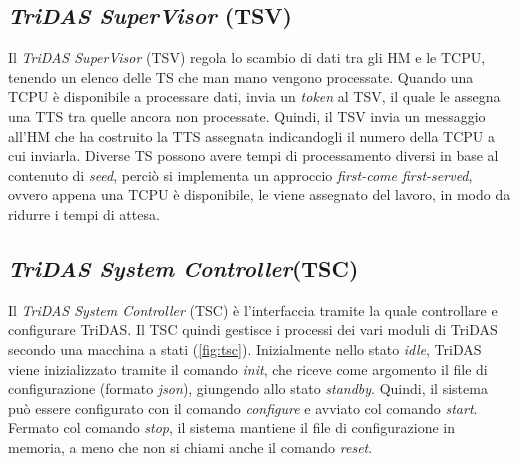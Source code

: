 \documentclass[../main.tex]{subfiles}
\begin{document}
\subsection{\emph{TriDAS SuperVisor} (TSV)}
Il \emph{TriDAS SuperVisor} (TSV) regola lo scambio di dati tra gli HM e le TCPU, tenendo un elenco delle TS che man mano vengono processate. Quando una TCPU è disponibile a processare dati, invia un \emph{token} al TSV, il quale le assegna una TTS tra quelle ancora non processate. Quindi, il TSV invia un messaggio all'HM che ha costruito la TTS assegnata indicandogli il numero della TCPU a cui inviarla. 
Diverse TS possono avere tempi di processamento diversi in base al contenuto di \emph{seed}, perciò si implementa un approccio \emph{first-come first-served}, ovvero appena una TCPU è disponibile, le viene assegnato del lavoro, in modo da ridurre i tempi di attesa.

\subsection{\emph{TriDAS System Controller}(TSC)}
Il \emph{TriDAS System Controller} (TSC) è l'interfaccia tramite la quale controllare e configurare TriDAS. Il TSC quindi gestisce i processi dei vari moduli di TriDAS secondo una macchina a stati (\autoref{fig:tsc}). Inizialmente nello stato \emph{idle}, TriDAS viene inizializzato tramite il comando \emph{init}, che riceve come argomento il file di configurazione (formato \emph{json}), giungendo allo stato \emph{standby}. Quindi, il sistema può essere configurato con il comando \emph{configure} e avviato col comando \emph{start}. Fermato col comando \emph{stop}, il sistema mantiene il file di configurazione in memoria, a meno che non si chiami anche il comando \emph{reset}. 
\end{document}
